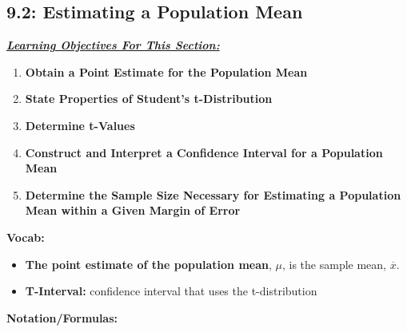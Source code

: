 \documentclass{report}
\begin{document}
     \pagebreak \bigbreak \noindent 
     \subsection{9.2: Estimating a Population Mean}
     \bigbreak \noindent 
     \textbf{\textit{\underline{Learning Objectives For This Section:}}}
     \begin{enumerate}
         \item \textbf{Obtain a Point Estimate for the Population Mean}
         \item \textbf{State Properties of Student’s t-Distribution}
         \item \textbf{Determine t-Values}
         \item \textbf{Construct and Interpret a Confidence Interval for a Population Mean}
         \item \textbf{Determine the Sample Size Necessary for Estimating a Population Mean within a Given Margin of Error}
     \end{enumerate}
     \bigbreak \noindent 
     \textbf{Vocab:}
     \begin{itemize}
         \item \textbf{The point estimate of the population mean}, $\mu$, is the sample mean, $\overline{x}$.
         \item \textbf{T-Interval:} confidence interval that uses the t-distribution
     \end{itemize}
     \bigbreak \noindent 
     \textbf{Notation/Formulas:}
\end{document}

